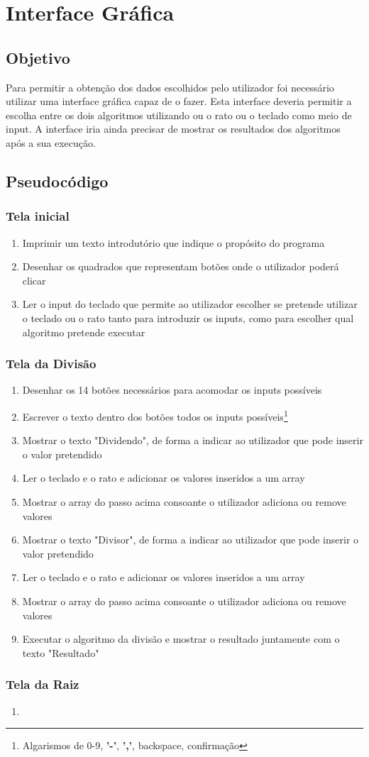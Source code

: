 \chapter{Interface Gráfica}

\section{Objetivo}
Para permitir a obtenção dos dados escolhidos pelo utilizador foi necessário utilizar uma interface gráfica capaz de o fazer. Esta interface deveria permitir a escolha entre os dois algoritmos utilizando ou o rato ou o teclado como meio de input. A interface iria ainda precisar de mostrar os resultados dos algoritmos após a sua execução.

\section{Pseudocódigo}
\subsection{Tela inicial}
	\begin{enumerate}
		\item Imprimir um texto introdutório que indique o propósito do programa
		\item Desenhar os quadrados que representam botões onde o utilizador poderá clicar
		\item Ler o input do teclado que permite ao utilizador escolher se pretende utilizar o teclado ou o rato tanto para introduzir os inputs, como para escolher qual algoritmo pretende executar
	\end{enumerate}
\subsection{Tela da Divisão}
\begin{enumerate}
	\item Desenhar os 14 botões necessários para acomodar os inputs possíveis 
	\item Escrever o texto dentro dos botões todos os inputs possíveis\footnote{Algarismos de 0-9, \textbf{'-'}, \textbf{','}, backspace, confirmação}
	\item Mostrar o texto "Dividendo", de forma a indicar ao utilizador que pode inserir o valor pretendido
	\item Ler o teclado e o rato e adicionar os valores inseridos a um array
	\item Mostrar o array do passo acima consoante o utilizador adiciona ou remove valores
	\item Mostrar o texto "Divisor", de forma a indicar ao utilizador que pode inserir o valor pretendido
	\item Ler o teclado e o rato e adicionar os valores inseridos a um array
	\item Mostrar o array do passo acima consoante o utilizador adiciona ou remove valores
	\item Executar o algoritmo da divisão e mostrar o resultado juntamente com o texto "Resultado"
\end{enumerate}

\subsection{Tela da Raiz}
\begin{enumerate}
	\item 
\end{enumerate}